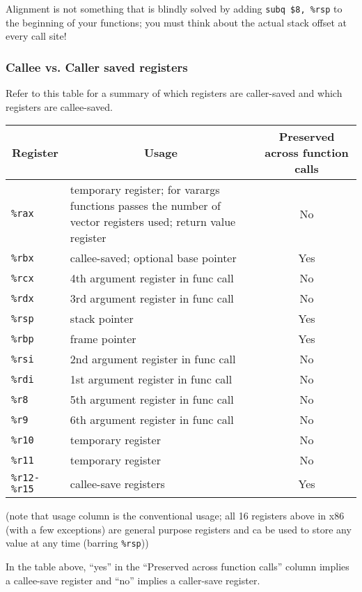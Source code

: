 \documentclass[11pt]{article}
\begin{document}
Alignment is not something that is blindly solved by adding \texttt{subq \$8, \%rsp} to
the beginning of your functions; you must think about the actual stack offset at every
call site!

\subsubsection{Callee vs. Caller saved registers}

Refer to this table for a summary of which registers are caller-saved and which registers
are callee-saved.

\begin{tabular}{ l | p{9cm} | c }
    \multicolumn{1}{c}{Register} & \multicolumn{1}{c}{Usage} &
    \multicolumn{1}{p{3cm}}{Preserved across function calls} \\\hline
    \texttt{\%rax} & temporary register; for varargs functions passes the number of vector
        registers used; return value register & No \\
    \texttt{\%rbx} & callee-saved; optional base pointer & Yes \\
    \texttt{\%rcx} & 4th argument register in func call & No \\
    \texttt{\%rdx} & 3rd argument register in func call & No \\
    \texttt{\%rsp} & stack pointer & Yes \\
    \texttt{\%rbp} & frame pointer & Yes \\
    \texttt{\%rsi} & 2nd argument register in func call & No \\
    \texttt{\%rdi} & 1st argument register in func call & No \\
    \texttt{\%r8}  & 5th argument register in func call & No \\
    \texttt{\%r9}  & 6th argument register in func call & No \\
    \texttt{\%r10} & temporary register & No \\
    \texttt{\%r11} & temporary register & No \\
    \texttt{\%r12-\%r15} & callee-save registers & Yes
\end{tabular}

(note that usage column is the conventional usage; all 16 registers above in x86 (with a few
exceptions) are general purpose registers and ca be used to store any value at any time
(barring \texttt{\%rsp}))

In the table above, ``yes'' in the ``Preserved across function calls'' column implies a
callee-save register and ``no'' implies a caller-save register.
\end{document}

